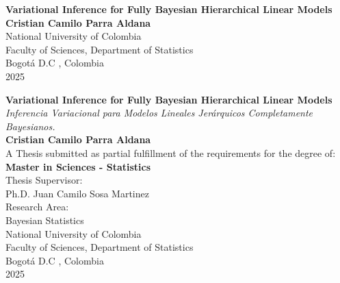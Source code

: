 \begin{center}
\begin{figure}
\centering%
%
\end{figure}
\thispagestyle{empty} \vspace*{2.0cm} \textbf{\huge
Variational Inference for Fully Bayesian Hierarchical Linear Models}\\[6.0cm]
\Large\textbf{Cristian Camilo Parra Aldana}\\[4.5cm]
\small National University of Colombia\\
Faculty of Sciences, Department of Statistics\\
Bogotá D.C , Colombia\\
2025\\
\end{center}

\newpage{\pagestyle{empty}\cleardoublepage}

\newpage
\begin{center}
\thispagestyle{empty} 
\vspace*{0.2cm} \textbf{\huge
Variational Inference for Fully Bayesian Hierarchical Linear Models}\\[0.1cm]
\textit{Inferencia Variacional para Modelos Lineales Jerárquicos Completamente Bayesianos.}\\[1.5cm]
\Large\textbf{Cristian Camilo Parra Aldana}\\[3.0cm]
\small A Thesis submitted as partial fulfillment of the requirements for the degree of:\\
\textbf{Master in Sciences - Statistics} \\[3.5cm]
Thesis Supervisor:\\
Ph.D. Juan Camilo Sosa Martinez\\[2.0cm]
Research Area:\\
Bayesian Statistics\\[2.0cm]
National University of Colombia\\
Faculty of Sciences, Department of Statistics\\
Bogotá D.C , Colombia\\
2025\\
\end{center}

\newpage{\pagestyle{empty}\cleardoublepage}

    \newpage
    \thispagestyle{empty} \textbf{}\normalsize
    \\\\\\%
    \\[4.0cm]
    
